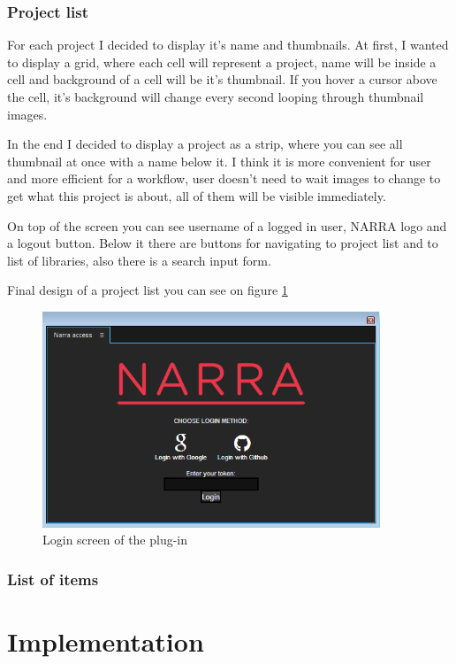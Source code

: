 \documentclass[thesis=B,english]{FITthesis}[2012/10/20]
\begin{document}
\subsection{Project list}
For each project I decided to display it's name and thumbnails. At first, I wanted to display a grid, where each cell will represent a project, name will be inside a cell and background of a cell will be it's thumbnail. If you hover a cursor above the cell, it's background will change every second looping through thumbnail images.

In the end I decided to display a project as a strip, where you can see all thumbnail at once with a name below it. I think it is more convenient for user and more efficient for a workflow, user doesn't need to wait images to change to get what this project is about, all of them will be visible immediately.

On top of the screen you can see username of a logged in user, NARRA logo and a logout button. Below it there are buttons for navigating to project list and to list of libraries, also there is a search input form.

Final design of a project list you can see on figure \ref{fig:projects}
	\begin{figure}
		\centering
		\includegraphics[width=0.9\textwidth]{LoginPage.png}
		\caption{Login screen of the plug-in}\label{fig:projects}
	\end{figure}
\subsection{List of items}
\chapter{Implementation}
\end{document}
